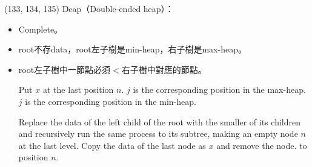 \item \begin{theorem}{(133, 134, 135)} Deap（Double-ended heap）： \label{deap}\begin{itemize}
        \item Complete。
        \item root不存data，root左子樹是min-heap，右子樹是max-heap。
        \item root左子樹中一節點必須$<$右子樹中對應的節點。
        \begin{algorithm}[H]
            \begin{algorithmic}[1]
                    \State Put $x$ at the last position $n$.
                        \State $j$ is the corresponding position in the max-heap.
                            \State {}
                            \State {}
                        \Else
                            \State {}
                        \EndIf
                    \Else {}
                        \State $j$ is the corresponding position in the min-heap.
                            \State {}
                            \State {}
                        \Else
                            \State {}
                        \EndIf
                    \EndIf
                \EndFunction
            \end{algorithmic}
        \end{algorithm} 
        \begin{algorithm}[H]
            \begin{algorithmic}[1]
                    \State Replace the data of the left child of the root with the smaller of its children and recursively run the same process to its subtree, making an empty node $n$ at the last level. 
                    \State Copy the data of the last node as $x$ and remove the node.
                    \State {} to position $n$.
                \EndFunction
            \end{algorithmic}
        \end{algorithm}
    \end{itemize}
\end{theorem}

